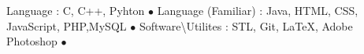       
\begin{cvhonors}
  \cvhonor
    {\small Language : }
    {\small C, C++, Pyhton}
    {}
    {$\bullet$}
  \cvhonor
    {\small Language (Familiar) : }
    {\small Java, HTML, CSS, JavaScript, PHP,MySQL}
    {}
    {$\bullet$}
  \cvhonor
    {\small Software\textbackslash Utilites : }
    {\small STL, Git, \LaTeX, Adobe Photoshop}
    {}
    {$\bullet$}
\end{cvhonors}